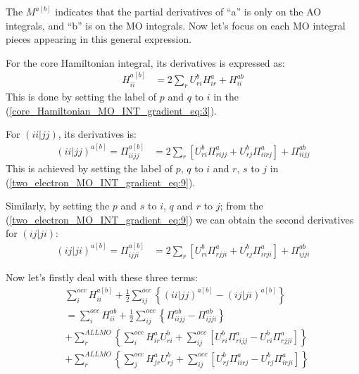 The $M^{a[b]}$ indicates that the partial derivatives of ``a'' is only on the
AO integrals, and ``b'' is on the MO integrals. Now let's focus on each MO
integral pieces appearing in this general expression. 

For the core Hamiltonian integral, its derivatives is expressed
as:
\begin{equation}
  \begin{split}
    H_{ii}^{a[b]} &=2\sum_{r}U^{b}_{ri}H^{a}_{ir}  + H^{ab}_{ii}
  \end{split}
     \label{SOD_energy_hf_derivatives_eq:2}
\end{equation}
This is done by setting the label of $p$ and $q$ to $i$ in the
(\ref{core_Hamiltonian_MO_INT_gradient_eq:3}).  

For $(ii|jj)$, its derivatives is:
\begin{equation}
  \label{SOD_energy_hf_derivatives_eq:3}
  \begin{split}
    (ii|jj)^{a[b]} = \Pi_{iijj}^{a[b]} &= 2\sum_{r}\left[ 
U^{b}_{ri}\Pi^{a}_{rijj} +
U^{b}_{rj}\Pi^{a}_{iirj}  
\right] + \Pi^{ab}_{iijj}
  \end{split}
\end{equation}
This is achieved by setting the label of $p$, $q$ to $i$ and $r$, $s$
to $j$ in (\ref{two_electron_MO_INT_gradient_eq:9}).

Similarly, by setting the $p$ and $s$ to $i$, $q$ and $r$ to $j$; from
the (\ref{two_electron_MO_INT_gradient_eq:9}) we can obtain the
second derivatives for $(ij|ji)$:
\begin{equation}
 \label{SOD_energy_hf_derivatives_eq:4}
  \begin{split}
    (ij|ji)^{a[b]} = \Pi_{ijji}^{a[b]} &= 2\sum_{r}\left[ 
U^{b}_{ri}\Pi^{a}_{rjji} +
U^{b}_{rj}\Pi^{a}_{irji}  
\right] + \Pi^{ab}_{ijji}
  \end{split}
\end{equation}

Now let's firstly deal with these three terms:
\begin{equation}
 \label{SOD_energy_hf_derivatives_eq:5}
\begin{split}
 &\sum_{i}^{occ}H_{ii}^{a[b]} + \frac{1}{2}
    \sum_{ij}^{occ}
    \left \{ ( ii|jj)^{a[b]} - ( ij|ji)^{a[b]}
    \right \}  \\
&=\sum_{i}^{occ}H_{ii}^{ab} + \frac{1}{2}
    \sum_{ij}^{occ}
    \left \{ \Pi_{iijj}^{ab} - \Pi_{ijji}^{ab}
    \right \}  \\
&+ \sum_{r}^{ALL MO}\left\lbrace  \sum_{i}^{occ}H_{ir}^{a}U^{b}_{ri} +
\sum_{ij}^{occ}\left[ U^{b}_{ri}\Pi_{rijj}^{a} -
U^{b}_{ri}\Pi^{a}_{rjji}\right] 
\right\rbrace \\
&+ \sum_{r}^{ALL MO}\left\lbrace  \sum_{j}^{occ}H_{jr}^{a}U^{b}_{rj} +
\sum_{ij}^{occ}\left[ U^{b}_{rj}\Pi^{a}_{iirj} -
U^{b}_{rj}\Pi^{a}_{irji}\right] \right\rbrace
\end{split}
\end{equation}

